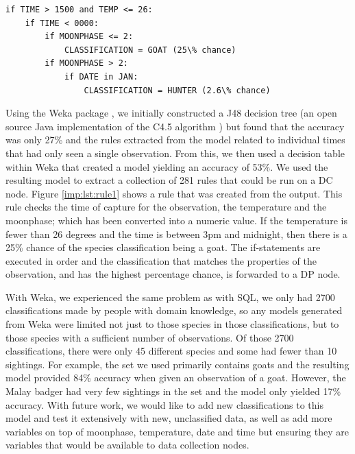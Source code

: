 				\begin{lstlisting}[breaklines=true, caption={Example Rule created from Existing Data}, label={imp:lst:rule1}]
if TIME > 1500 and TEMP <= 26:
    if TIME < 0000:
        if MOONPHASE <= 2:
            CLASSIFICATION = GOAT (25\% chance)
        if MOONPHASE > 2:
            if DATE in JAN:
                CLASSIFICATION = HUNTER (2.6\% chance)
				\end{lstlisting}
			

			Using the Weka package \cite{hall2009weka}, we initially constructed a J48 decision tree (an open source Java implementation of the C4.5 algorithm \cite{quinlan93}) but found that the accuracy was only 27\% and the rules extracted from the model related to individual times that had only seen a single observation. From this, we then used a decision table \cite{Kohavi1995} within Weka that created a model yielding an accuracy of 53\%. We used the resulting model to extract a collection of 281 rules that could be run on a DC node. Figure \ref{imp:lst:rule1} shows a rule that was created from the output. This rule checks the time of capture for the observation, the temperature and the moonphase; which has been converted into a numeric value. If the temperature is fewer than 26 degrees and the time is between 3pm and midnight, then there is a 25\% chance of the species classification being a goat. The if-statements are executed in order and the classification that matches the properties of the observation, and has the highest percentage chance, is forwarded to a DP node.

			With Weka, we experienced the same problem as with SQL, we only had 2700 classifications made by people with domain knowledge, so any models generated from Weka were limited not just to those species in those classifications, but to those species with a sufficient number of observations. Of those 2700 classifications, there were only 45 different species and some had fewer than 10 sightings. For example, the set we used primarily contains goats and the resulting model provided 84\% accuracy when given an observation of a goat. However, the Malay badger had very few sightings in the set and the model only yielded 17\% accuracy. With future work, we would like to add new classifications to this model and test it extensively with new, unclassified data, as well as add more variables on top of moonphase, temperature, date and time but ensuring they are variables that would be available to data collection nodes.
            
